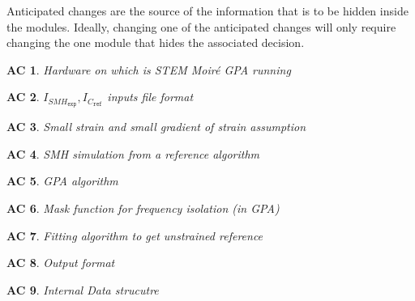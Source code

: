\documentclass[12pt, titlepage]{article}
\newcommand{\progname}{STEM Moir{\'e} GPA}
\newtheorem{AC}{AC}
\begin{document}
Anticipated changes are the source of the information that is to be hidden
inside the modules. Ideally, changing one of the anticipated changes will only
require changing the one module that hides the associated decision. 

\begin{AC}\normalfont Hardware on which is \progname{} running
\label{AC_Hardware}
\end{AC}

\begin{AC}\normalfont 
$I_{\mathit{SMH}_{\texttt{exp}}},I_{\mathit{C}_{\texttt{ref}}}$ inputs file 
format
\label{AC_FormatFile}
\end{AC}

\begin{AC}\normalfont Small strain and small gradient of strain assumption
\label{AC_Assum_SmallStrain}
\end{AC}

\begin{AC}\normalfont SMH simulation from a reference algorithm
\label{AC_SMH_algo}
\end{AC}

\begin{AC}\normalfont GPA algorithm
\label{AC_GPA_algo}
\end{AC}

\begin{AC}\normalfont Mask function for frequency isolation (in GPA)
\label{AC_Mask}
\end{AC}

\begin{AC}\normalfont Fitting algorithm to get unstrained reference 
\label{AC_RefFit}
\end{AC}

\begin{AC}\normalfont Output format
\label{AC_Output}
\end{AC}

\begin{AC}\normalfont Internal Data strucutre
\label{AC_Data}
\end{AC}
\end{document}
